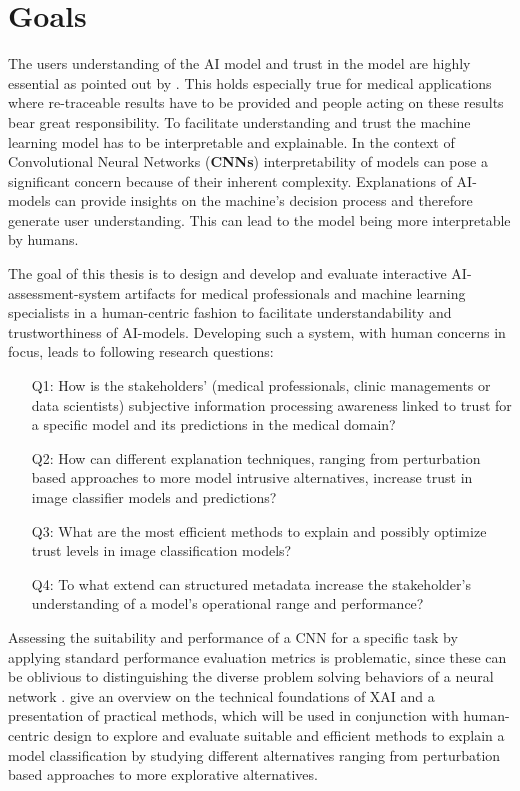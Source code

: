 \documentclass[11pt,a4paper,english]{scrreprt}
\begin{document}
\section{Goals}
The users understanding of the AI model and trust in the model are highly essential as pointed out by \textcite{knapic_explainable_2021}. This holds especially true for medical applications where re-traceable results have to be provided and people acting on these results bear great responsibility. To facilitate understanding and trust the machine learning model has to be interpretable and explainable. In the context of Convolutional Neural Networks (\textbf{CNNs}) interpretability of models can pose a significant concern because of their inherent complexity. Explanations of AI-models can provide insights on the machine's decision process and therefore generate user understanding. This can lead to the model being more interpretable by humans.

The goal of this thesis is to design and develop and evaluate interactive AI-assessment-system artifacts for medical professionals and machine learning specialists in a human-centric fashion to facilitate understandability and trustworthiness of AI-models. Developing such a system, with human concerns in focus, leads to following research questions:
\begin{itemize}
    \item[Q1:] How is the stakeholders' (medical professionals, clinic managements or data scientists) subjective information processing awareness linked to trust for a specific model and its predictions in the medical domain?
    \item[Q2:] How can different explanation techniques, ranging from perturbation based approaches to more model intrusive alternatives, increase trust in image classifier models and predictions?
    \item[Q3:] What are the most efficient methods to explain and possibly optimize trust levels in image classification models?
    \item[Q4:] To what extend can structured metadata increase the stakeholder's understanding of a model's operational range and performance?
\end{itemize}

Assessing the suitability and performance of a CNN for a specific task by applying standard performance evaluation metrics is problematic, since these can be oblivious to distinguishing the diverse problem solving behaviors of a neural network \parencite{lapuschkin_unmasking_2019}. \textcite{samek_explaining_2021,JMLR:v17:15-618,ribeiro_anchors_2018} give an overview on the technical foundations of XAI and a presentation of practical methods, which will be used in conjunction with human-centric design to explore and evaluate suitable and efficient methods to explain a model classification by studying different alternatives ranging from perturbation based approaches to more explorative alternatives.
\end{document}
